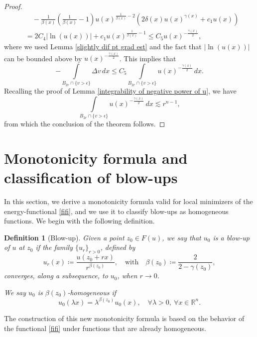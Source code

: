 \documentclass[reqno,11pt]{amsart}
\newtheorem{definition}{Definition}[section]
\newcommand{\1}{\mathds{1}}
\numberwithin{equation}{section}
\begin{document}
\begin{proof}
\begin{align*}
         & \quad - \frac{1}{\beta(x)}\left(\frac{1}{\beta(x)} -1\right)u(x)^{\frac{1}{\beta(x)}-2}\left(2\delta(x)u(x)^{\gamma(x)} + c_1 u(x)\right)\\
         & =  2C_4|\ln(u(x))| + c_1u(x)^{\frac{1}{\beta(x)}-1} \leq C_5 u(x)^{-\frac{\gamma(x)}{2}},
\end{align*}
where we used Lemma \ref{slightly dif pt grad est} and the fact that $|\ln(u(x))|$ can be bounded above by $u(x)^{-\frac{\gamma(x)}{2}}$. This implies that
$$
  -\int\limits_{B_{2r} \cap \{v > \epsilon \}}\Delta v\,dx \leq C_5\int\limits_{B_{2r} \cap \{v > \epsilon \}}u(x)^{-\frac{\gamma(x)}{2}}\,dx. 
$$
Recalling the proof of Lemma \ref{integrability of negative power of u}, we have
$$
	\int\limits_{B_{2r} \cap \{v > \epsilon \}}u(x)^{-\frac{\gamma(x)}{2}}\,dx \lesssim r^{n-1},
$$
from which the conclusion of the theorem follows.
\end{proof}

\section{Monotonicity formula and classification of blow-ups}\label{sct monotonicity}

In this section, we derive a monotonicity formula valid for local minimizers of the energy-functional \eqref{fifi}, and we use it to classify blow-ups as homogeneous functions. We begin with the following definition.

\begin{definition}[Blow-up]\label{blowup definition}
Given a point $z_0 \in F(u)$, we say that $u_0$ is a blow-up of $u$ at $z_0$ if the family $\{u_r \}_{r>0}$, defined by 
$$
    u_r(x) \coloneqq \frac{u(z_0 + rx)}{r^{\beta(z_0)}}, \quad \text{with} \quad \beta(z_0) \coloneqq \frac{2}{2-\gamma(z_0)},
$$
converges, along a subsequence, to $u_0$, when $r\to 0$.

We say $u_0$ is $\beta(z_0)$-homogeneous if
$$
	u_0(\lambda x) = \lambda^{\beta(z_0)}u_0(x), \quad \forall \lambda > 0,  \ \forall x \in \mathbb{R}^n.
$$
\end{definition}

The construction of this new monotonicity formula is based on the behavior of the functional \eqref{fifi} under functions that are already homogeneous.
\end{document}

